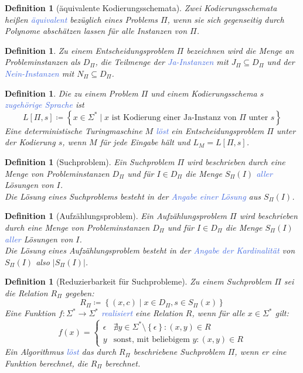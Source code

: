\documentclass[11pt]{article}
\newcommand{\tcol}[1]{\textcolor{RoyalBlue}{#1}}
\newcommand{\set}[1]{\left\lbrace #1\right\rbrace}
\theoremstyle{break}
\newtheorem{defi}[satz]{Definition}
\begin{document}
    \begin{defi}[äquivalente Kodierungsschemata]
        Zwei Kodierungsschemata heißen \tcol{äquivalent} bezüglich eines Problems $\Pi$, wenn sie sich gegenseitig durch Polynome abschätzen lassen für alle Instanzen von $\Pi$.
    \end{defi}

    \begin{defi}
        Zu einem Entscheidungsproblem $\Pi$ bezeichnen wird die Menge an Probleminstanzen als $D_\Pi$, die Teilmenge der \tcol{Ja-Instanzen} mit $J_\Pi\subseteq D_\Pi$ und der \tcol{Nein-Instanzen} mit $N_\Pi\subseteq D_\Pi$.
    \end{defi}

    \begin{defi}
        Die zu einem Problem $\Pi$ und einem Kodierungsschema $s$ \tcol{zugehörige Sprache} ist
        \[L[\Pi,s]\coloneqq\set{x\in\Sigma^*\mid x\text{ ist Kodierung einer Ja-Instanz von $\Pi$ unter $s$}}\]
        Eine deterministische Turingmaschine $M$ \tcol{löst} ein Entscheidungsproblem $\Pi$ unter der Kodierung $s$, wenn $M$ für jede Eingabe hält und $L_M=L[\Pi,s]$.
    \end{defi}

    \begin{defi}[Suchproblem]
        Ein Suchproblem $\Pi$ wird beschrieben durch eine Menge von Probleminstanzen $D_\Pi$ und für $I\in D_\Pi$ die Menge $S_\Pi(I)$ \tcol{aller} Lösungen von $I$.\\
        Die Lösung eines Suchproblems besteht in der \tcol{Angabe einer Lösung} aus $S_\Pi(I)$.
    \end{defi}

    \begin{defi}[Aufzählungsproblem]
        Ein Aufzählungsproblem $\Pi$ wird beschrieben durch eine Menge von Probleminstanzen $D_\Pi$ und für $I\in D_\Pi$ die Menge $S_\Pi(I)$ \tcol{aller} Lösungen von $I$.\\
        Die Lösung eines Aufzählungsproblem besteht in der \tcol{Angabe der Kardinalität} von $S_\Pi(I)$ also $|S_\Pi(I)|$.
    \end{defi}

    \begin{defi}[Reduzierbarkeit für Suchprobleme]
        Zu einem Suchproblem $\Pi$ sei die Relation $R_\Pi$ gegeben:
        \[R_\Pi\coloneqq\set{(x,c)\mid x\in D_\Pi,s\in S_\Pi(x)}\]
        Eine Funktion $f\colon\Sigma^*\to\Sigma^*$ \tcol{realisiert} eine Relation $R$, wenn für alle $x\in\Sigma^*$ gilt:
        \[f(x)= \begin{cases}
                    \epsilon & \nexists y\in\Sigma^*\setminus\set{\epsilon}\colon (x,y)\in R \\
                    y & \text{sonst, mit beliebigem } y\colon (x,y)\in R
        \end{cases}
        \]
        Ein Algorithmus \tcol{löst} das durch $R_\Pi$ beschriebene Suchproblem $\Pi$, wenn er eine Funktion berechnet, die $R_\Pi$ berechnet.
    \end{defi}
\end{document}
